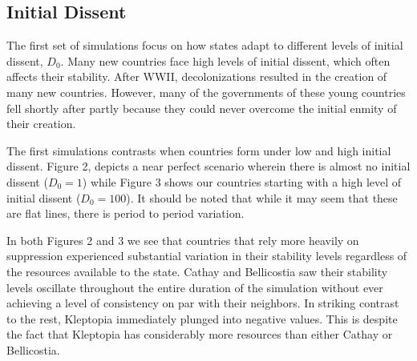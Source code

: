 \documentclass[12pt]{article}
\begin{document}
\begin{spacing}{1.5}
\subsection{Initial Dissent}


The first set of simulations focus on how states adapt to different levels of initial dissent, $D_0$. Many new countries face high levels of initial dissent, which often affects their stability. After WWII, decolonizations resulted in the creation of many new countries. However, many of the governments of these young countries fell shortly after partly because they could never overcome the initial enmity of their creation. 


The first simulations contrasts when countries form under low and high initial dissent. Figure 2, depicts a near perfect scenario wherein there is almost no initial dissent ($D_0 = 1$) while Figure 3 shows our countries starting with a high level of initial dissent ($D_0 = 100$). It should be noted that while it may seem that these are flat lines, there is period to period variation.  

In both Figures 2 and 3 we see that countries that rely more heavily on suppression experienced substantial variation in their stability levels regardless of the resources available to the state. Cathay and Bellicostia saw their stability levels oscillate throughout the entire duration of the simulation without ever achieving a level of consistency on par with their neighbors. In striking contrast to the rest, Kleptopia immediately plunged into negative values. This is despite the fact that Kleptopia has considerably more resources than either Cathay or Bellicostia. 


\end{spacing}
\end{document}
